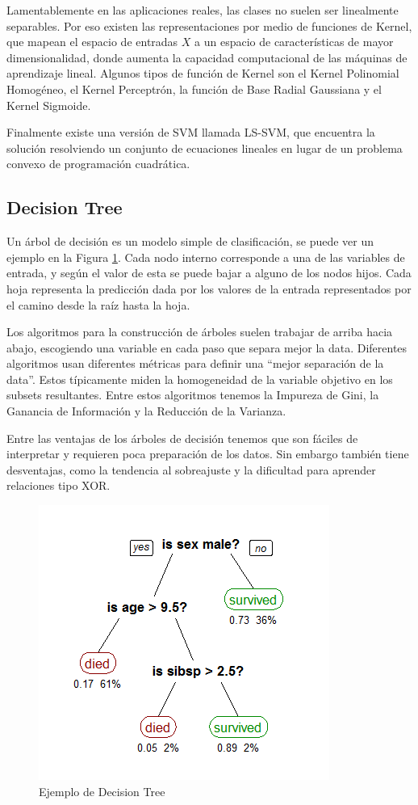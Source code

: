 Lamentablemente en las aplicaciones reales, las clases no suelen ser linealmente separables. Por eso existen las representaciones por medio de funciones de Kernel, que mapean el espacio de entradas $X$ a un espacio de características de mayor dimensionalidad, donde aumenta la capacidad computacional de las máquinas de aprendizaje lineal. Algunos tipos de función de Kernel son el Kernel Polinomial Homogéneo, el Kernel Perceptrón, la función de Base Radial Gaussiana y el Kernel Sigmoide.

Finalmente existe una versión de \ac{SVM} llamada \ac{LS-SVM}, que encuentra la solución resolviendo un conjunto de ecuaciones lineales en lugar de un problema convexo de programación cuadrática.

\subsection{Decision Tree}

Un árbol de decisión es un modelo simple de clasificación, se puede ver un ejemplo en la Figura \ref{fig:dt-eg}. Cada nodo interno corresponde a una de las variables de entrada, y según el valor de esta se puede bajar a alguno de los nodos hijos. Cada hoja representa la predicción dada por los valores de la entrada representados por el camino desde la raíz hasta la hoja.

Los algoritmos para la construcción de árboles suelen trabajar de arriba hacia abajo, escogiendo una variable en cada paso que separa mejor la data. Diferentes algoritmos usan diferentes métricas para definir una ``mejor separación de la data''. Estos típicamente miden la homogeneidad de la variable objetivo en los subsets resultantes. Entre estos algoritmos tenemos la Impureza de Gini, la Ganancia de Información y la Reducción de la Varianza.

Entre las ventajas de los árboles de decisión tenemos que son fáciles de interpretar y requieren poca preparación de los datos. Sin embargo también tiene desventajas, como la tendencia al sobreajuste y la dificultad para aprender relaciones tipo XOR.

\begin{figure}
    \centering
    \caption{Ejemplo de Decision Tree}
    \label{fig:dt-eg}
    \includegraphics[width=0.6\linewidth]{graficos/dt_example.png}
\end{figure}

